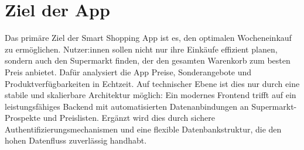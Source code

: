 \section{Ziel der App}
Das primäre Ziel der Smart Shopping App ist es, den optimalen Wocheneinkauf zu ermöglichen. Nutzer:innen sollen nicht nur ihre Einkäufe effizient planen, sondern auch den Supermarkt finden, der den gesamten Warenkorb zum besten Preis anbietet. Dafür analysiert die App Preise, Sonderangebote und Produktverfügbarkeiten in Echtzeit. Auf technischer Ebene ist dies nur durch eine stabile und skalierbare Architektur möglich: Ein modernes Frontend trifft auf ein leistungsfähiges Backend mit automatisierten Datenanbindungen an Supermarkt-Prospekte und Preislisten. Ergänzt wird dies durch sichere Authentifizierungsmechanismen und eine flexible Datenbankstruktur, die den hohen Datenfluss zuverlässig handhabt.
